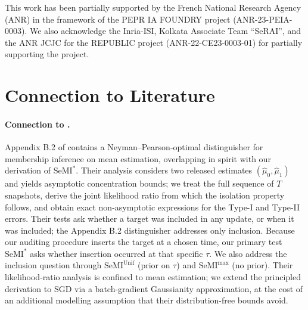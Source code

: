 \documentclass{article}
\theoremstyle{plain}
\theoremstyle{definition}
\theoremstyle{remark}
\newcommand{\SeMIstar}{\mathrm{SeMI}^{\ast}}
\newcommand{\SeMIunif}{\mathrm{SeMI}^{\mathrm{Unif}}}
\newcommand{\SeMImax}{\mathrm{SeMI}^{\max}}
\begin{document}
\begin{ack}
  This work has been partially supported by the French National Research Agency (ANR) in the framework of the PEPR IA FOUNDRY project (ANR-23-PEIA-0003). We also acknowledge the Inria-ISI, Kolkata Associate Team ``SeRAI'', and the ANR JCJC for the REPUBLIC project (ANR-22-CE23-0003-01) for partially supporting the project.
\end{ack}







\newpage
\appendix

\section{Connection to Literature}

\paragraph{Connection to \cite{jagielskiHowCombineMembershipInference2023}.} Appendix B.2 of \cite{jagielskiHowCombineMembershipInference2023} contains a Neyman--Pearson-optimal distinguisher for membership inference on mean estimation, overlapping in spirit with our derivation of $\SeMIstar$. Their analysis considers two released estimates $(\hat\mu_0, \hat\mu_1)$ and yields asymptotic concentration bounds; we treat the full sequence of $T$ snapshots, derive the joint likelihood ratio from which the isolation property follows, and obtain exact non-asymptotic expressions for the Type-I and Type-II errors. Their tests ask whether a target was included in any update, or when it was included; the Appendix B.2 distinguisher addresses only inclusion. Because our auditing procedure inserts the target at a chosen time, our primary test $\SeMIstar$ asks whether insertion occurred at that specific $\tau$. We also address the inclusion question through $\SeMIunif$ (prior on $\tau$) and $\SeMImax$ (no prior). Their likelihood-ratio analysis is confined to mean estimation; we extend the principled derivation to SGD via a batch-gradient Gaussianity approximation, at the cost of an additional modelling assumption that their distribution-free bounds avoid.
\end{document}
